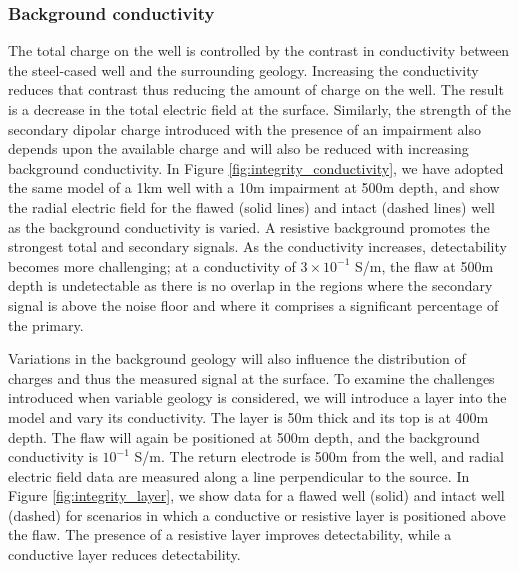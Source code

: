 

\subsubsection{Background conductivity}

The total charge on the well is controlled by the contrast in conductivity between the steel-cased well and the surrounding geology. Increasing the conductivity reduces that contrast thus reducing the amount of charge on the well. The result is a decrease in the total electric field at the surface. Similarly, the strength of the secondary dipolar charge introduced with the presence of an impairment also depends upon the available charge and will also be reduced with increasing background conductivity. In Figure \ref{fig:integrity_conductivity}, we have adopted the same model of a 1km well with a 10m impairment at 500m depth, and show the radial electric field for the flawed (solid lines) and intact (dashed lines) well as the background conductivity is varied. A resistive background promotes the strongest total and secondary signals. As the conductivity increases, detectability becomes more challenging; at a conductivity of $3 \times 10^{-1}$ S/m, the flaw at 500m depth is undetectable as there is no overlap in the regions where the secondary signal is above the noise floor and where it comprises a significant percentage of the primary.




Variations in the background geology will also influence the distribution of charges and thus the measured signal at the surface. To examine the challenges introduced when variable geology is considered, we will introduce a layer into the model and vary its conductivity. The layer is 50m thick and its top is at 400m depth. The flaw will again be positioned at 500m depth, and the background conductivity is $10^{-1}$ S/m. The return electrode is 500m from the well, and radial electric field data are measured along a line perpendicular to the source. In Figure \ref{fig:integrity_layer}, we show data for a flawed well (solid) and intact well (dashed) for scenarios in which a conductive or resistive layer is positioned above the flaw. The presence of a resistive layer improves detectability, while a conductive layer reduces detectability.



